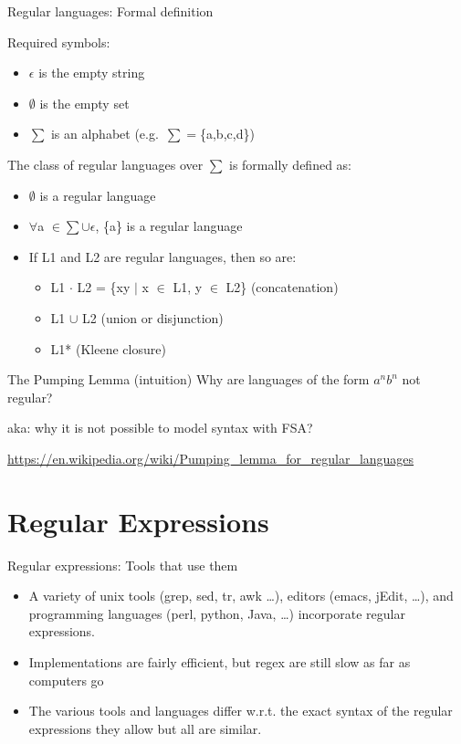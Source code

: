 \documentclass{beamer}
\begin{document}
\begin{frame}{Regular languages: Formal definition}

Required symbols:

\begin{itemize}
\item $\epsilon$ is the empty string
\item $\emptyset$ is the empty set
\item $\sum$ is an alphabet (e.g.\ $\sum = $\{a,b,c,d\})
\end{itemize}

The class of regular languages over $\sum$ is formally defined as: 

\begin{itemize}
\item $\emptyset$  is a regular language
\item $\forall$a $\in \sum \cup \epsilon$, \{a\} is a regular language  
\item If L1 and L2 are regular languages, then so are:
\begin{itemize}
\item L1 $\cdot$ L2 = \{xy $\vert$ x $\in$ L1, y $\in$ L2\} (concatenation)
\item L1 $\cup$ L2 (union or disjunction)
\item L1* (Kleene closure)
\end{itemize}
\end{itemize}
\end{frame}


\begin{frame}{The Pumping Lemma (intuition)}
  Why are languages of the form $a^nb^n$ not regular?

  aka: why it is not possible to model syntax with FSA?

  \url{https://en.wikipedia.org/wiki/Pumping_lemma_for_regular_languages}
\end{frame}

\section{Regular Expressions}

\newcommand{\A}{\texttt{\ensuremath{\,\hat{ }\,}}}

\begin{frame}{Regular expressions: Tools that use them}
  \begin{itemize}
  \item A variety of unix tools (grep, sed, tr, awk \ldots), editors
    (emacs, jEdit, \ldots), and programming languages (perl, python,
    Java, \ldots) incorporate regular expressions.
        
  \item Implementations are fairly efficient, but regex are still slow
    as far as computers go
    
  \item The various tools and languages differ w.r.t. the exact syntax
    of the regular expressions they allow but all are similar.
  \end{itemize}
\end{frame}
\end{document}
